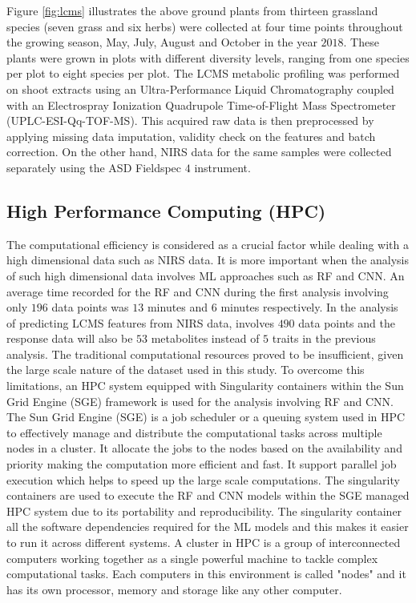 \documentclass[12pt,a4paper]{report}
\begin{document}
Figure \ref{fig:lcms} illustrates the above ground plants from thirteen grassland species (seven grass and six herbs) were collected at four time points throughout the growing season, May, July, August and October in the year $2018$. These plants were grown in plots with different diversity levels, ranging from one species per plot to eight species per plot. The LCMS metabolic profiling was performed on shoot extracts using an Ultra-Performance Liquid Chromatography coupled with an Electrospray Ionization Quadrupole Time-of-Flight Mass Spectrometer (UPLC-ESI-Qq-TOF-MS). This acquired raw data is then preprocessed by applying missing data imputation, validity check on the features and batch correction. On the other hand, NIRS data for the same samples were collected separately using the ASD Fieldspec $4$ instrument. \\

\subsection{High Performance Computing (HPC) }
The computational efficiency is considered as a crucial factor while dealing with a high dimensional data such as NIRS data. It is more important when the analysis of such high dimensional data involves ML approaches such as RF and CNN. An average time recorded for the RF and CNN during the first analysis involving only $196$ data points was $13$ minutes and $6$ minutes respectively. In the analysis of predicting LCMS features from NIRS data, involves $490$ data points and the response data will also be $53$ metabolites instead of $5$ traits in the previous analysis. The traditional computational resources proved to be insufficient, given the large scale nature of the dataset used in this study. To overcome this limitations, an HPC system equipped with Singularity containers within the Sun Grid Engine (SGE) framework is used for the analysis involving RF and CNN. \\

The Sun Grid Engine (SGE) is a job scheduler or a queuing system used in HPC to effectively manage and distribute the computational tasks across multiple nodes in a cluster. It allocate the jobs to the nodes based on the availability and priority making the computation more efficient and fast. It support parallel job execution which helps to speed up the large scale computations. The singularity containers are used to execute the RF and CNN models within the SGE managed HPC system due to its portability and reproducibility. The singularity container all the software dependencies required for the ML models and this makes it easier to run it across different systems. A cluster in HPC is a group of interconnected computers working together as a single powerful machine to tackle complex computational tasks. Each computers in this environment is called "nodes" and it has its own processor, memory and storage like any other computer. \\
\end{document}
